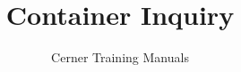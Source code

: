

\title{Container Inquiry} %
\author{Cerner Training Manuals}



    \frontmatter
        \maketitle %
        \begin{fullwidth}
            \tableofcontents
        \end{fullwidth}

    \mainmatter
        

    \backmatter


